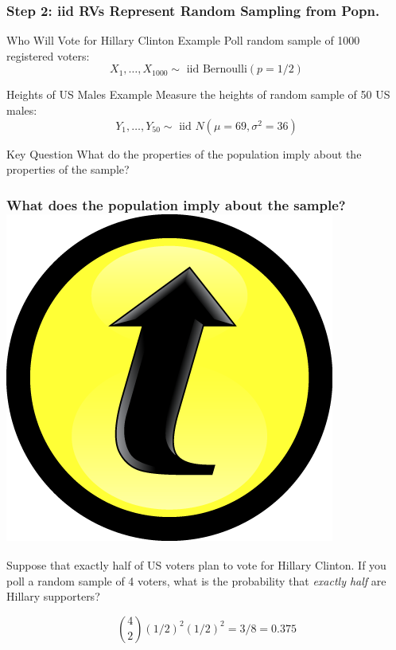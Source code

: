 \documentclass[handout]{beamer}
\begin{document}
\begin{frame}
  \frametitle{Step 2: iid RVs Represent Random Sampling from Popn.}
  \begin{block}{Who Will Vote for Hillary Clinton Example}
   Poll random sample of 1000 registered voters:
   $$X_1, \hdots, X_{1000} \sim \mbox{ iid Bernoulli}(p = 1/2)$$
  \end{block}
  \begin{block}{Heights of US Males Example}
   Measure the heights of random sample of 50 US males:
   $$Y_1, \hdots, Y_{50}  \sim \mbox{ iid } N(\mu = 69, \sigma^2 = 36)$$
  \end{block}

  \begin{block}{Key Question}
   What do the properties of the population imply about the properties of the sample? 
  \end{block}
\end{frame}
\begin{frame}
  \frametitle{What does the population imply about the sample? \hfill\includegraphics[scale = 0.05]{./images/clicker}}
Suppose that exactly half of US voters plan to vote for Hillary Clinton. 
If you poll a random sample of 4 voters, what is the probability that \emph{exactly half} are Hillary supporters? 

\pause

\alert{$${4 \choose 2} \left( 1/2 \right)^2 \left( 1/2 \right)^2 = 3/8 = 0.375$$}
\end{frame}
\end{document}

